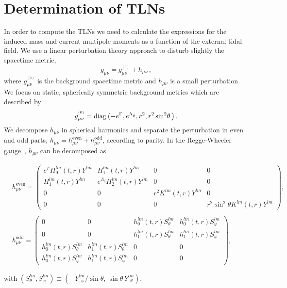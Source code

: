 \documentclass[aps,twocolumn,showpacs,preprintnumbers,nofootinbib,prd,superscriptaddress,groupedaddress,10pt]{revtex4-1}
\begin{document}
\section{Determination of TLNs}\label{app:comp}
In order to compute the TLNs we need to calculate the expressions for the induced mass and current multipole moments as a function of the external tidal field. We use a linear perturbation theory approach to disturb slightly the spacetime metric,
%
\begin{equation}
g_{\mu\nu}=g_{\mu\nu}^{^{(0)}}+h_{\mu\nu}\,,\label{metricpertdef}
\end{equation}
%
where $g_{\mu\nu}^{^{(0)}}$ is the background spacetime metric and $h_{\mu\nu}$ is a small perturbation. We focus on static, spherically symmetric background metrics which are described by
%
\begin{equation}
\label{staticmetric}
g^{^{(0)}}_{\mu\nu}={\rm diag}\left(-e^{\Gamma},e^{\Lambda_g},r^2,r^2\sin^2{\!\theta}\,\right).
\end{equation}
%
We decompose $h_{\mu\nu}$ in spherical harmonics and separate the perturbation in even and odd parts, $h_{\mu\nu}=h_{\mu\nu}^{\text{even}}+h_{\mu\nu}^{\text{odd}}$, according to parity. In the Regge-Wheeler gauge~\cite{Regge:1957td}, $h_{\mu\nu}$ can be decomposed as
%
\begin{widetext}
\begin{align}
\label{heven}
&h_{\mu\nu}^{\text{even}}=
\left(\begin{array}{cccc}
e^{\Gamma}H_0^{lm}(t,r)Y^{lm} & H_1^{lm}(t,r)Y^{lm} & 0 & 0 \\
 H_1^{lm}(t,r)Y^{lm} & e^{\Lambda_g}H_2^{lm}(t,r)Y^{lm} & 0 &0\\
 0 &0 & r^2 K^{lm}(t,r)Y^{lm}& 0\\ 
0&0 &0 & r^2\sin^2{\theta} K^{lm}(t,r)Y^{lm}
\end{array}\right)
,\\
\nonumber\\
\label{hodd}
&h_{\mu\nu}^{\text{odd}}=\left(\begin{array}{cccc}
0 & 0 & h_0^{lm}(t,r)S_\theta^{lm} & h_0^{lm}(t,r)S_\varphi^{lm} \\
0 &0 & h_1^{lm}(t,r)S_\theta^{lm} & h_1^{lm}(t,r)S_\varphi^{lm} \\
h_0^{lm}(t,r)S_\theta^{lm} &h_1^{lm}(t,r)S_\theta^{lm}  &0 &0\\
h_0^{lm}(t,r)S_\varphi^{lm}& h_1^{lm}(t,r)S_\varphi^{lm} & 0 &0 \end{array}
\right),
\end{align}
\end{widetext}
%
with $\left(S_\theta^{lm},S_\varphi^{lm}\right)\equiv \left(-Y_{,\varphi}^{lm}/\sin{\theta},\,\sin{\theta} \,Y_{,\theta}^{lm}\right).$	
\end{document}
